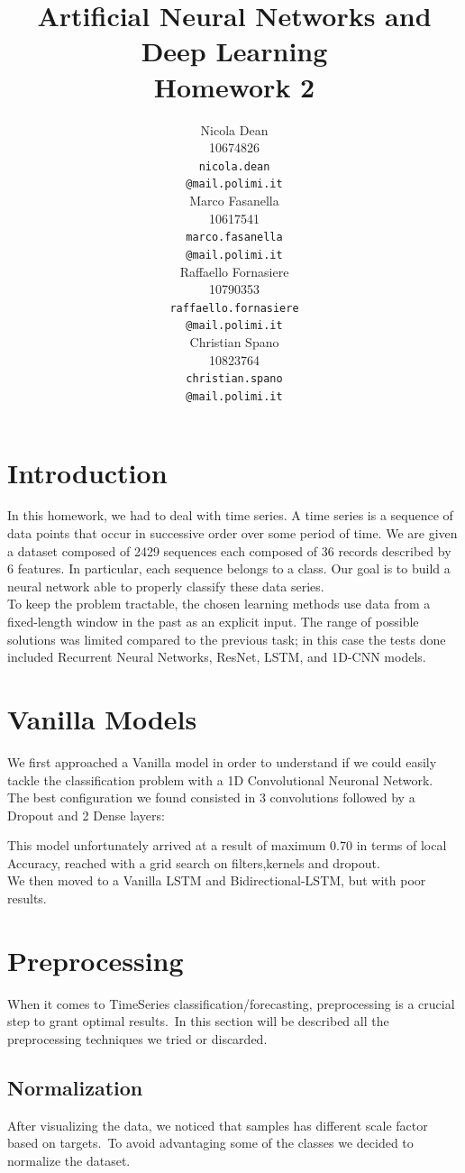 \documentclass[11pt]{article}
\title{Artificial Neural Networks and Deep Learning \\
Homework 2}
\author{
  Nicola Dean \\
  10674826 \\
  {\tt nicola.dean \\
  \tt @mail.polimi.it} \\\And
  Marco Fasanella \\
  10617541 \\
  {\tt marco.fasanella \\
  \tt @mail.polimi.it} \\\And
  Raffaello Fornasiere \\
    10790353 \\
    {\tt raffaello.fornasiere \\
    \tt @mail.polimi.it} \\\And
  Christian Spano \\
  10823764 \\
  {\tt christian.spano \\
  \tt @mail.polimi.it} \\}
\date{}
\begin{document}
\maketitle


\section{Introduction}
In this homework, we had to deal with time series. A time series is a sequence of data points that occur in successive order over some period of time. We are given a dataset composed of 2429 sequences each composed of 36 records described by 6 features. In particular, each sequence belongs to a class. Our goal is to build a neural network able to properly classify these data series.\\[0.1cm]
To keep the problem tractable, the chosen learning methods use data from a fixed-length window in the past as an explicit input. The range of possible solutions was limited compared to the previous task; in this case the tests done included Recurrent Neural Networks, ResNet, LSTM, and 1D-CNN models.
\section{Vanilla Models}
We first approached a Vanilla model in order to understand if we could easily tackle the classification problem with a 1D Convolutional Neuronal Network.\\
The best configuration we found consisted in 3 convolutions followed by a Dropout and 2 Dense layers:

This model unfortunately arrived at a result of maximum 0.70 in terms of local Accuracy, reached with a grid search on filters,kernels and dropout.\\
We then moved to a Vanilla LSTM and Bidirectional-LSTM, but with poor results.

\section{Preprocessing}
When it comes to TimeSeries classification/forecasting, preprocessing is a crucial step to grant optimal results.\
In this section will be described all the preprocessing techniques we tried or discarded.
\subsection{Normalization}
After visualizing the data, we noticed that samples has different scale factor based on targets.\
To avoid advantaging some of the classes we decided to normalize the dataset.
\end{document}
